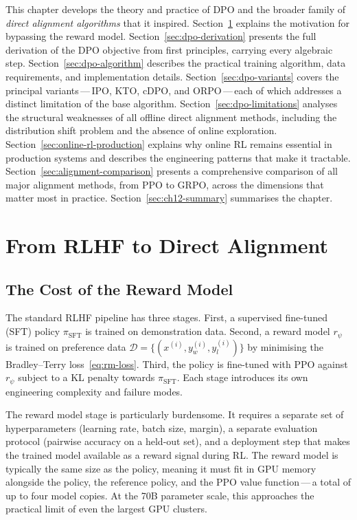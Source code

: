 This chapter develops the theory and practice of DPO and the broader family of \emph{direct alignment algorithms} that it inspired. Section~\ref{sec:dpo-motivation} explains the motivation for bypassing the reward model. Section~\ref{sec:dpo-derivation} presents the full derivation of the DPO objective from first principles, carrying every algebraic step. Section~\ref{sec:dpo-algorithm} describes the practical training algorithm, data requirements, and implementation details. Section~\ref{sec:dpo-variants} covers the principal variants\,---\,IPO, KTO, cDPO, and ORPO\,---\,each of which addresses a distinct limitation of the base algorithm. Section~\ref{sec:dpo-limitations} analyses the structural weaknesses of all offline direct alignment methods, including the distribution shift problem and the absence of online exploration. Section~\ref{sec:online-rl-production} explains why online RL remains essential in production systems and describes the engineering patterns that make it tractable. Section~\ref{sec:alignment-comparison} presents a comprehensive comparison of all major alignment methods, from PPO to GRPO, across the dimensions that matter most in practice. Section~\ref{sec:ch12-summary} summarises the chapter.

\section{From RLHF to Direct Alignment}
\label{sec:dpo-motivation}

\subsection{The Cost of the Reward Model}

The standard RLHF pipeline has three stages. First, a supervised fine-tuned (SFT) policy $\pi_\mathrm{SFT}$ is trained on demonstration data. Second, a reward model $r_\psi$ is trained on preference data $\mathcal{D} = \{(x^{(i)}, y_w^{(i)}, y_l^{(i)})\}$ by minimising the Bradley--Terry loss~\eqref{eq:rm-loss}. Third, the policy is fine-tuned with PPO against $r_\psi$ subject to a KL penalty towards $\pi_\mathrm{SFT}$. Each stage introduces its own engineering complexity and failure modes.

The reward model stage is particularly burdensome. It requires a separate set of hyperparameters (learning rate, batch size, margin), a separate evaluation protocol (pairwise accuracy on a held-out set), and a deployment step that makes the trained model available as a reward signal during RL. The reward model is typically the same size as the policy, meaning it must fit in GPU memory alongside the policy, the reference policy, and the PPO value function\,---\,a total of up to four model copies. At the 70B parameter scale, this approaches the practical limit of even the largest GPU clusters.

